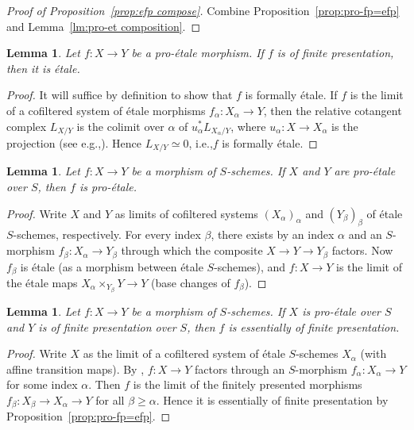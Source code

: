 \documentclass[11pt]{article}
\newcommand{\ie}{i.e.,\xspace}
\newcommand{\eg}{e.g.,\xspace}
\numberwithin{equation}{section}\renewcommand{\encodingdefault}{TU}
\newtheorem{lm}[thm]{Lemma}
\theoremstyle{remark}
\theoremstyle{definition}
\numberwithin{equation}{thm}
\begin{document}
\begin{proof}[Proof of Proposition~\ref{prop:efp compose}]
Combine Proposition~\ref{prop:pro-fp=efp} and Lemma~\ref{lm:pro-et composition}.
\end{proof}

\begin{lm}\label{lm:pro-et+fp}
Let $f : X \to Y$ be a pro-étale morphism.
If $f$ is of finite presentation, then it is étale.
\end{lm}
\begin{proof}
It will suffice by definition to show that $f$ is formally étale.
If $f$ is the limit of a cofiltered system of étale morphisms $f_\alpha : X_\alpha \to Y$, then the relative cotangent complex $L_{X/Y}$ is the colimit over $\alpha$ of $u_\alpha^*L_{X_\alpha/Y}$, where $u_\alpha : X \to X_\alpha$ is the projection (see \eg \cite[Tags~08S9, 08R2]{Stacks}).
Hence $L_{X/Y} \simeq 0$, \ie $f$ is formally étale.
\end{proof}

\begin{lm}\label{lm:pro-et 2-of-3}
Let $f : X \to Y$ be a morphism of $S$-schemes.
If $X$ and $Y$ are pro-étale over $S$, then $f$ is pro-étale.
\end{lm}
\begin{proof}
Write $X$ and $Y$ as limits of cofiltered systems $(X_\alpha)_\alpha$ and $(Y_\beta)_\beta$ of étale $S$\nobreakdash-schemes, respectively.
For every index $\beta$, there exists by \cite[Prop.\,8.14.2]{EGA4} an index $\alpha$ and an $S$-morphism $f_\beta : X_\alpha \to Y_\beta$ through which the composite $X \to Y \to Y_\beta$ factors.
Now $f_\beta$ is étale (as a morphism between étale $S$-schemes), and $f : X \to Y$ is the limit of the étale maps $X_\alpha \times_{Y_\beta} Y \to Y$ (base changes of $f_\beta$).
\end{proof}

\begin{lm}\label{lm:efp 2-of-3}
Let $f : X \to Y$ be a morphism of $S$-schemes.
If $X$ is pro-étale over $S$ and $Y$ is of finite presentation over $S$, then $f$ is essentially of finite presentation.
\end{lm}
\begin{proof}
Write $X$ as the limit of a cofiltered system of étale $S$-schemes $X_\alpha$ (with affine transition maps).
By \cite[Prop.\,8.14.2]{EGA4}, $f : X \to Y$ factors through an $S$-morphism $f_\alpha : X_\alpha \to Y$ for some index $\alpha$.
Then $f$ is the limit of the finitely presented morphisms $f_\beta : X_\beta \to X_\alpha \to Y$ for all $\beta\geqslant\alpha$.
Hence it is essentially of finite presentation by Proposition~\ref{prop:pro-fp=efp}.
\end{proof}
\end{document}
